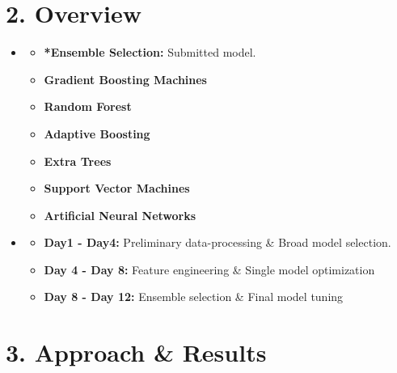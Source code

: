 \section*{2. Overview}
\medskip
\begin{itemize}

    \item {}
    \begin{itemize}
    \item \textbf{*Ensemble Selection:} Submitted model. 
    \item \textbf{Gradient Boosting Machines} 
    \item \textbf{Random Forest} 
    \item \textbf{Adaptive Boosting} 
    \item \textbf{Extra Trees} 
    \item \textbf{Support Vector Machines} 
    \item \textbf{Artificial Neural Networks} 
    \end{itemize}

    \item {}
    \begin{itemize}
    \item \textbf{Day1 - Day4:} Preliminary data-processing \& Broad model selection. 
    \item \textbf{Day 4 - Day 8:} Feature engineering \& Single model optimization
    \item \textbf{Day 8 - Day 12:} Ensemble selection \& Final model tuning
    \end{itemize}

\end{itemize}


\newpage


\section*{3. Approach \& Results}
